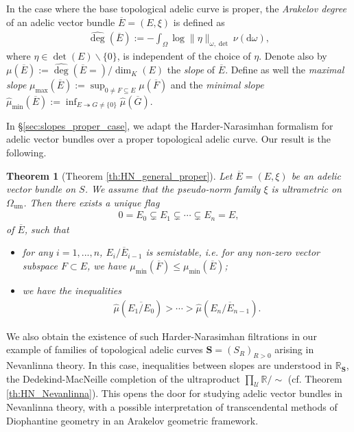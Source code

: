 \documentclass [11pt,reqno]{amsart}
\def\bR{{\mathbb{R}}}
\newcommand{\1}{\mathmybb{1}}
\def\cU{{\mathcal{U}}}
\def\diff{\mathrm{d}}
\def\um{\operatorname{um}}
\def\setminus{\smallsetminus}
\newtheorem{theo}{Theorem}
\begin{document}
In the case where the base topological adelic curve is proper, the \emph{Arakelov degree} of an adelic vector bundle $\overline{E}=(E,\xi)$ is defined as
\begin{align*}
\widehat{\deg}(\overline{E}):= - \int_{\Omega} \log\|\eta\|_{\omega,\det}\nu(\diff\omega),
\end{align*}
where $\eta\in\det(E)\setminus\{0\}$, is independent of the choice of $\eta$. Denote also by $\mu(\overline{E}):=\widehat{\deg}(\overline{E}=)/\dim_{K}(E)$ the \emph{slope} of $\overline{E}$. Define as well the \emph{maximal slope} $\mu_{\max}(\overline{E}):=\sup_{0 \neq F\subseteq E}\mu(\overline{F})$ and the \emph{minimal slope} $\widehat{\mu}_{\min}(\overline{E}) := \inf_{E \twoheadrightarrow G \neq \{0\} } \widehat{\mu}(\overline{G})$.	

In \S \ref{sec:slopes_proper_case}, we adapt the Harder-Narasimhan formalism for adelic vector bundles over a proper topological adelic curve. Our result is the following. 
\begin{theo}[Theorem \ref{th:HN_general_proper}]
\label{th:HN_intro}
Let $\overline{E}=(E,\xi)$ be an adelic vector bundle on $S$. We assume that the pseudo-norm family $\xi$ is ultrametric on $\Omega_{\um}$. Then there exists a unique flag 
\begin{align*}
0=E_0 \subsetneq E_1 \subsetneq \cdots \subsetneq E_n = E,
\end{align*}
of $\overline{E}$, such that
\begin{itemize}
	\item[(1)] for any $i=1,...,n$, $\overline{E_i/E_{i-1}}$ is semistable, i.e. for any non-zero vector subspace $F\subset E$, we have $\mu_{\min}(\overline{F})\leq \mu_{\min}(\overline{E})$;
	\item[(2)] we have the inequalities 
	\begin{align*}
	\widehat{\mu}(\overline{E_1/E_0}) > \cdots > \widehat{\mu}(\overline{E_n/E_{n-1}}).
	\end{align*}
\end{itemize}
\end{theo}

We also obtain the existence of such Harder-Narasimhan filtrations in our example of families of topological adelic curves $\mathbf{S}=(S_{R})_{R>0}$ arising in Nevanlinna theory. In this case, inequalities between slopes are understood in $\bR_{\mathbf{S}}$, the Dedekind-MacNeille completion of the ultraproduct $\prod_{\cU}\bR/\sim$ (cf. Theorem \ref{th:HN_Nevanlinna}). This opens the door for studying adelic vector bundles in Nevanlinna theory, with a possible interpretation of transcendental methods of Diophantine geometry in an Arakelov geometric framework.
\end{document}
